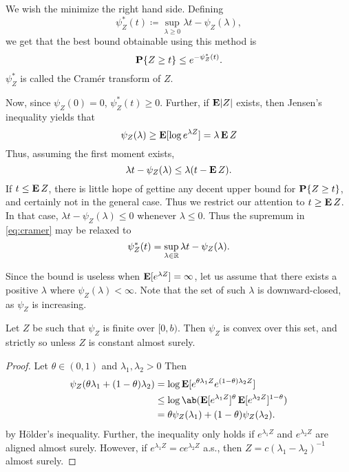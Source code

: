 We wish the minimize the right hand side.
Defining \begin{equation} \label{eq:cramer}
    \psi_Z^*(t) \coloneq \sup_{\lambda \ge 0} \lambda t - \psi_Z(\lambda),
\end{equation} we get that the best bound obtainable using this method is
\begin{equation} \label{eq:chernoff}
    \operatorname{\mathbf P}\{Z \ge t\} \le e^{-\psi_Z^*(t)}.
\end{equation}
$\psi_Z^*$ is called the Cram\'er transform of $Z$.

Now, since $\psi_Z(0) = 0$, $\psi_Z^*(t) \ge 0$.
Further, if $\operatorname{\mathbf E}\lvert Z\rvert$ exists, then Jensen's inequality yields that \[
    \psi_Z(\lambda) \ge \operatorname{\mathbf E} [\log e^{\lambda Z}] = \lambda \operatorname{\mathbf E} Z
\] Thus, assuming the first moment exists, \[
    \lambda t - \psi_Z(\lambda) \le \lambda (t - \operatorname{\mathbf E} Z).
\] If $t \le \operatorname{\mathbf E} Z$, there is little hope of gettine any decent upper bound
for $\operatorname{\mathbf P}\{Z \ge t\}$, and certainly not in the general case.
Thus we restrict our attention to $t \ge \operatorname{\mathbf E} Z$.
In that case, $\lambda t - \psi_Z(\lambda) \le 0$ whenever $\lambda \le 0$.
Thus the supremum in \cref{eq:cramer} may be relaxed to \[
    \psi_Z^*(t) = \sup_{\lambda \in \mathbb{R}} \lambda t - \psi_Z(\lambda).
\]

Since the bound is useless when $\operatorname{\mathbf E}[e^{\lambda Z}] = \infty$, let us assume
that there exists a positive $\lambda$ where $\psi_Z(\lambda) < \infty$.
Note that the set of such $\lambda$ is downward-closed, as $\psi_Z$ is
increasing.

\begin{proposition} \label{thm:log-mgf-convex}
    Let $Z$ be such that $\psi_Z$ is finite over $[0, b)$.
    Then $\psi_Z$ is convex over this set, and strictly so unless $Z$
    is constant almost surely.
\end{proposition}
\begin{proof}
    Let $\theta \in (0, 1)$ and $\lambda_1, \lambda_2 > 0$
    Then \begin{align*}
        \psi_Z(\theta \lambda_1 + (1 - \theta) \lambda_2)
            &= \log \E[e^{\theta \lambda_1 Z} e^{(1 - \theta) \lambda_2 Z}] \\
            &\le \log \ab(\E[e^{\lambda_1 Z}]^\theta \E[e^{\lambda_2 Z}]^{1 - \theta}) \\
            &= \theta \psi_Z(\lambda_1) + (1 - \theta) \psi_Z(\lambda_2).
    \end{align*}
    by H\"older's inequality.
    Further, the inequality only holds if $e^{\lambda_1 Z}$ and
    $e^{\lambda_2 Z}$ are aligned almost surely.
    However, if $e^{\lambda_1 Z} = c e^{\lambda_2 Z}$ a.s., then
    $Z = c (\lambda_1 - \lambda_2)^{-1}$ almost surely.
\end{proof}

